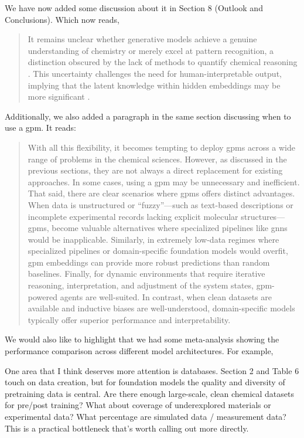 \begin{reply}
 We have now added some discussion about it in Section 8 (Outlook and Conclusions). Which now reads,

\begin{quote}
    It remains unclear whether generative models achieve a genuine understanding of chemistry or merely excel at pattern recognition, a distinction obscured by the lack of methods to quantify chemical reasoning \autocite{alampara2024probing}. This uncertainty challenges the need for human-interpretable output, implying that the latent knowledge within hidden embeddings may be more significant \autocite{hao2024training}.
\end{quote}

Additionally, we also added a paragraph in the same section discussing when to use a \gls{gpm}. It reads:

\begin{quote}
    With all this flexibility, it becomes tempting to deploy \glspl{gpm} across a wide range of problems in the chemical sciences. However, as discussed in the previous sections, they are not always a direct replacement for existing approaches. In some cases, using a \gls{gpm} may be unnecessary and inefficient. That said, there are clear scenarios where \glspl{gpm} offers distinct advantages. When data is unstructured or \enquote{fuzzy}---such as text-based descriptions or incomplete experimental records lacking explicit molecular structures---\glspl{gpm}, become valuable alternatives where specialized pipelines like \glspl{gnn} would be inapplicable. Similarly, in extremely low-data regimes where specialized pipelines or domain-specific foundation models would overfit, \gls{gpm} embeddings can provide more robust predictions than random baselines. Finally, for dynamic environments that require iterative reasoning, interpretation, and adjustment of the system states, \gls{gpm}-powered agents are well-suited. In contrast, when clean datasets are available and inductive biases are well-understood, domain-specific models typically offer superior performance and interpretability.
\end{quote}


We would also like to highlight that we had some meta-analysis showing the performance comparison across different model architectures. For example,  

\end{reply}

\begin{point}
One area that I think deserves more attention is databases. Section 2 and Table 6 touch on data creation, but for foundation models the quality and diversity of pretraining data is central. Are there enough large-scale, clean chemical datasets for pre/post training? What about coverage of underexplored materials or experimental data? What percentage are simulated data / measurement data? This is a practical bottleneck that's worth calling out more directly.
\end{point}

